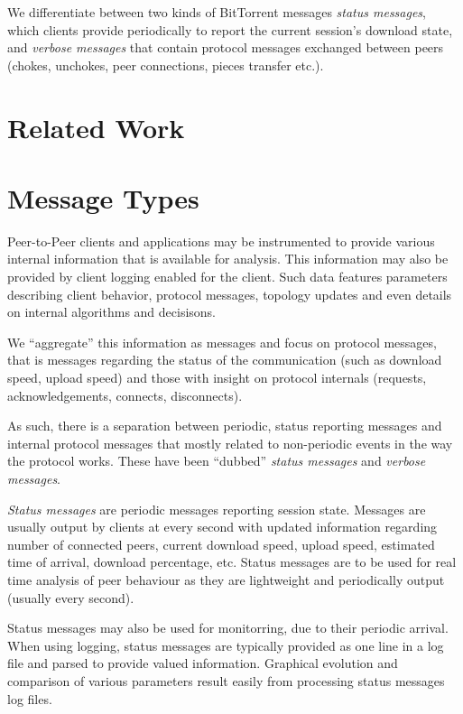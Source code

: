 We differentiate between two kinds of BitTorrent messages \textit{status
messages}, which clients provide periodically to report the current session’s
download state, and \textit{verbose messages} that contain protocol messages
exchanged between peers (chokes, unchokes, peer connections, pieces transfer
etc.).

\section{Related Work}
\label{sec:proto-measure:related}


\section{Message Types}
\label{sec:proto-measure:message-types}

Peer-to-Peer clients and applications may be instrumented to provide various
internal information that is available for analysis. This information may also
be provided by client logging enabled for the client. Such data features
parameters describing client behavior, protocol messages, topology updates and
even details on internal algorithms and decisisons.

We ``aggregate'' this information as messages and focus on protocol messages,
that is messages regarding the status of the communication (such as download
speed, upload speed) and those with insight on protocol internals
(requests, acknowledgements, connects, disconnects).

As such, there is a separation between periodic, status reporting messages and
internal protocol messages that mostly related to non-periodic events in the
way the protocol works. These have been ``dubbed'' \textit{status messages}
and \textit{verbose messages}.

\textit{Status messages} are periodic messages reporting session state.
Messages are usually output by clients at every second with updated
information regarding number of connected peers, current download speed,
upload speed, estimated time of arrival, download percentage, etc. Status
messages are to be used for real time analysis of peer behaviour as they are
lightweight and periodically output (usually every second).

Status messages may also be used for monitorring, due to their periodic
arrival. When using logging, status messages are typically provided as one
line in a log file and parsed to provide valued information. Graphical
evolution and comparison of various parameters result easily from processing
status messages log files.

